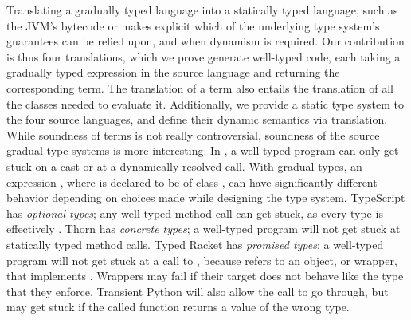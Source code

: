 \documentclass[acmlarge, anonymous, authordraft, review]{acmart} %
\begin{document}
Translating a gradually typed language into a statically typed language,
such as the JVM's bytecode or \kafka makes explicit which of the underlying
type system's guarantees can be relied upon, and when dynamism is required.
Our contribution is thus four translations, which we prove generate
well-typed code, each taking a gradually typed expression \HT\e\T in the
source language and returning the corresponding \kafka term. The translation
of a term also entails the translation of all the classes needed to evaluate
it. Additionally, we provide a static type system to the four source
languages, and define their dynamic semantics via translation.  While
soundness of \kafka terms is not really controversial, soundness of the
source gradual type systems is more interesting.  In \kafka, a well-typed
program can only get stuck on a cast or at a dynamically resolved call.
With gradual types, an expression \Call\x\m\e, where \x is declared to be of
class \C, can have significantly different behavior depending on choices
made while designing the type system. TypeScript has \emph{optional types};
any well-typed method call can get stuck, as every type is effectively
\any. Thorn has \emph{concrete types}; a well-typed program will not get
stuck at statically typed method calls. Typed Racket has \emph{promised
  types}; a well-typed program will not get stuck at a call to \m, because
\x refers to an object, or wrapper, that implements \m. Wrappers may fail if
their target does not behave like the type that they enforce. Transient
Python will also allow the call to go through, but may get stuck if the
called function returns a value of the wrong type.
\end{document}
